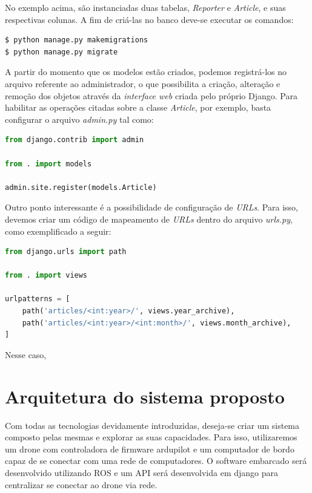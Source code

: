 \documentclass[12pt,a4paper,oneside]{book}
\begin{document}
No exemplo acima, são instanciadas duas tabelas, \textit{Reporter} e \textit{Article}, e suas respectivas colunas. A fim de criá-las no banco deve-se executar os comandos:

\begin{lstlisting}[language=bash] 
$ python manage.py makemigrations
$ python manage.py migrate
\end{lstlisting}

A partir do momento que os modelos estão criados, podemos registrá-los no arquivo referente ao administrador, o que possibilita a criação, alteração e remoção dos objetos através da \textit{interface web} criada pelo próprio Django. Para habilitar as operações citadas sobre a classe \textit{Article}, por exemplo, basta configurar o arquivo \textit{admin.py} tal como:

\begin{lstlisting}[language=Python]
from django.contrib import admin

from . import models

admin.site.register(models.Article)
\end{lstlisting}

Outro ponto interessante é a possibilidade de configuração de \textit{URLs}. Para isso, devemos criar um código de mapeamento de \textit{URLs} dentro do arquivo \textit{urls.py}, como exemplificado a seguir:

\begin{lstlisting}[language=Python]
from django.urls import path

from . import views

urlpatterns = [
    path('articles/<int:year>/', views.year_archive),
    path('articles/<int:year>/<int:month>/', views.month_archive),
]
\end{lstlisting}

Nesse caso, 


\section{Arquitetura do sistema proposto}

Com todas as tecnologias devidamente introduzidas, deseja-se criar um sistema composto pelas mesmas e explorar as suas capacidades. Para isso, utilizaremos um drone com controladora de firmware ardupilot e um computador de bordo capaz de se conectar com uma rede de computadores. O software embarcado será desenvolvido utilizando ROS e um API será desenvolvida em django para centralizar se conectar ao drone via rede. 
\end{document}
